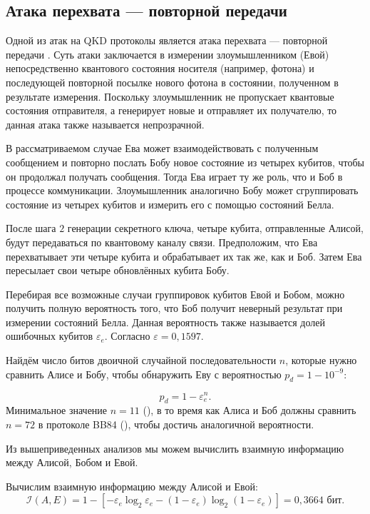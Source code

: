 \documentclass[a4paper,11pt]{article}
\begin{document}
\subsection{Атака перехвата --- повторной передачи}
Одной из атак на QKD протоколы является атака перехвата --- повторной передачи \cite{ira1, ira2, ira3}. Суть атаки заключается в измерении злоумышленником (Евой) непосредственно квантового состояния носителя (например, фотона) и последующей повторной посылке нового фотона в состоянии, полученном в результате
измерения. Поскольку злоумышленник не пропускает квантовые состояния отправителя, а генерирует новые и отправляет их получателю, то данная атака также называется непрозрачной. 

В рассматриваемом случае Ева может взаимодействовать с полученным сообщением и повторно послать Бобу новое состояние из четырех кубитов, чтобы он продолжал получать сообщения. Тогда Ева играет ту же роль, что и Боб в процессе коммуникации. Злоумышленник аналогично Бобу может сгруппировать состояние из четырех кубитов и измерить его с помощью состояний Белла.

После шага $2$ генерации секретного ключа, четыре кубита, отправленные Алисой, будут передаваться по квантовому каналу связи. Предположим, что Ева перехватывает эти четыре кубита и обрабатывает их так же, как и Боб. Затем Ева пересылает свои четыре обновлённых кубита Бобу. 

Перебирая все возможные случаи группировок кубитов Евой и Бобом, можно получить полную вероятность того, что Боб получит неверный результат при измерении состояний Белла. Данная вероятность также называется долей ошибочных кубитов $\varepsilon_e$. Согласно \cite{base} $\varepsilon = 0,1597$.


Найдём число битов двоичной случайной последовательности $n$, которые нужно сравнить Алисе и Бобу, чтобы обнаружить Еву с вероятностью $p_d = 1 - 10^{-9}$:

\begin{equation*}
p_d = 1 - \varepsilon_e ^n.
\end{equation*}
Минимальное значение $n = 11$ (\cite{base}), в то время как Алиса и Боб должны сравнить $n = 72$ в протоколе BB84 (\cite{eleven}), чтобы достичь аналогичной вероятности. 


Из вышеприведенных анализов мы можем вычислить взаимную информацию между Алисой, Бобом и Евой. 

Вычислим взаимную информацию между Алисой и Евой:  
\begin{equation*}
\mathcal{I}(A, E) = 1 - [- \varepsilon_e \log_2 \varepsilon_e -(1-\varepsilon_e)\log_2 (1-\varepsilon_e) ] = 0,3664 \text{ бит}.
\end{equation*}
\end{document}
